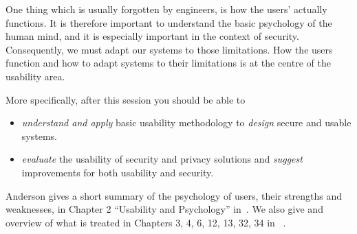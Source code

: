 One thing which is usually forgotten by engineers, is how the users' actually 
functions.
It is therefore important to understand the basic psychology of the human mind,
and it is especially important in the context of security.
Consequently, we must adapt our systems to those limitations.
How the users function and how to adapt systems to their limitations is at the 
centre of the usability area.

More specifically, after this session you should be able to
\begin{itemize}
  \item \emph{understand and apply} basic usability methodology to 
    \emph{design} secure and usable systems.
  \item \emph{evaluate} the usability of security and privacy solutions and 
    \emph{suggest} improvements for both usability and security.
\end{itemize}

Anderson gives a short summary of the psychology of users, their strengths and 
weaknesses, in Chapter 2 \enquote{Usability and Psychology} 
in~\cite{Anderson2008sea}.
We also give and overview of what is treated in Chapters 3, 4, 6, 12, 13, 32, 
34 in ~\cite{SecurityAndUsability}.
